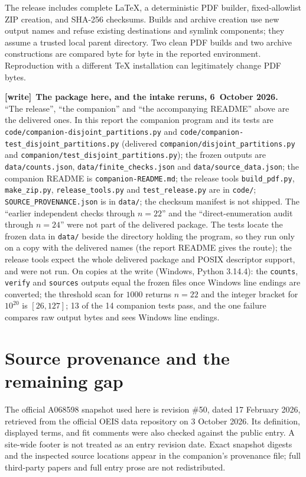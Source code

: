\documentclass[11pt,letterpaper]{article}
\numberwithin{equation}{section}
\theoremstyle{remark}\newtheorem{remark}[theorem]{Remark}
\newcommand{\file}[1]{\nolinkurl{#1}}
\newenvironment{writenote}[1][]{\par\smallskip\begingroup\small
 \noindent\textbf{[write]}\if\relax\detokenize{#1}\relax\else~\textbf{#1.}\fi\ }%
 {\par\endgroup\smallskip}
\begin{document}
The release includes complete LaTeX, a deterministic PDF builder,
fixed-allowlist ZIP creation, and SHA-256 checksums. Builds and archive
creation use new output names and refuse existing destinations and
symlink components; they assume a trusted local parent directory.
Two clean PDF builds and two archive constructions are compared
byte for byte in the reported environment. Reproduction with a
different TeX installation can legitimately change PDF bytes.

\begin{writenote}[The package here, and the intake reruns, 6~October 2026]
``The release'', ``the companion'' and ``the accompanying README'' above are
the delivered ones. In this report the companion program and its tests are
\file{code/companion-disjoint_partitions.py} and
\file{code/companion-test_disjoint_partitions.py} (delivered
\file{companion/disjoint_partitions.py} and
\file{companion/test_disjoint_partitions.py}); the frozen outputs are
\file{data/counts.json}, \file{data/finite_checks.json} and
\file{data/source_data.json}; the companion README is
\file{companion-README.md}; the release tools \file{build_pdf.py},
\file{make_zip.py}, \file{release_tools.py} and \file{test_release.py} are in
\file{code/}; \file{SOURCE_PROVENANCE.json} is in \file{data/}; the
checksum manifest is not shipped. The ``earlier independent checks through
$n=22$'' and the ``direct-enumeration audit through $n=24$'' were not part
of the delivered package. The tests locate the frozen data in
\file{data/} beside the directory holding the program, so they run only on
a copy with the delivered names (the report README gives the route); the
release tools expect the whole delivered package and POSIX descriptor
support, and were not run. On copies at the write (Windows, Python 3.14.4):
the \texttt{counts}, \texttt{verify} and \texttt{sources} outputs equal the
frozen files once Windows line endings are converted; the threshold scan for
$1000$ returns $n=22$ and the integer bracket for $10^{20}$ is $[26,127]$;
13 of the 14 companion tests pass, and the one failure compares raw output
bytes and sees Windows line endings.
\end{writenote}

\section{Source provenance and the remaining gap}
The official A068598 snapshot used here is revision \#50, dated
17 February 2026, retrieved from the official OEIS data repository on
3 October 2026. Its definition, displayed terms, and fit comments
were also checked against the public entry. A site-wide footer is
not treated as an entry revision date. Exact snapshot digests and
the inspected source locations appear in the companion's provenance
file; full third-party papers and full entry prose are not redistributed.
\end{document}
